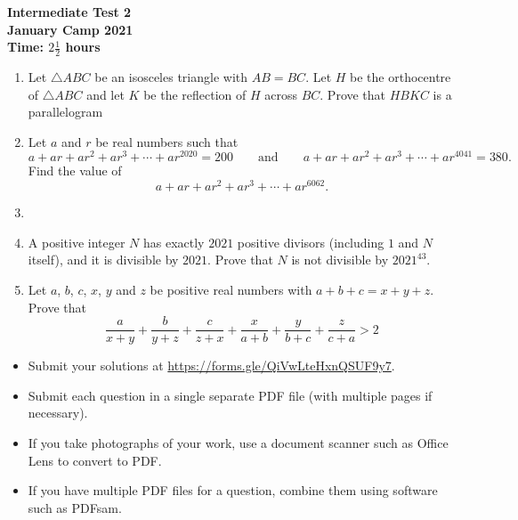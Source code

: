 \documentclass{article}
\begin{document}
\thispagestyle{empty}

\begin{center}
  \textbf{\Large Intermediate Test 2}
  \\ \vspace{1em}
  \textbf{\large January Camp 2021}
  \\ \vspace{1em}
  \textbf{\large Time: $2\frac{1}{2}$ hours}
\end{center}

\vspace{24pt}

\begin{enumerate}[1.]

\item %
Let $\triangle ABC$ be an isosceles triangle with $AB = BC$. Let $H$ be the orthocentre of $\triangle ABC$ and let $K$ be the reflection of $H$ across $BC$. Prove that $HBKC$ is a parallelogram

\item %
Let $a$ and $r$ be real numbers such that
\[ a +ar +ar^2 +ar^3 +\dotsb +ar^{2020} = 200 \qquad\text{and}\qquad a +ar +ar^2 +ar^3 +\dotsb +ar^{4041} = 380. \]
Find the value of
\[ a +ar +ar^2 +ar^3 +\dotsb +ar^{6062}. \]


\item %


\item %
A positive integer $N$ has exactly $2021$ positive divisors (including $1$ and $N$ itself), and it is divisible by $2021$.
Prove that $N$ is not divisible by $2021^{43}$.


\item %
Let $a$, $b$, $c$, $x$, $y$ and $z$ be positive real numbers with $a + b + c = x + y + z$. Prove that 
$$\frac{a}{x + y} + \frac{b}{y + z} + \frac{c}{z + x} + \frac{x}{a + b} + \frac{y}{b + c} + \frac{z}{c + a} > 2 $$


\end{enumerate}


\vfill
\begin{itemize}
	\item Submit your solutions at \url{https://forms.gle/QiVwLteHxnQSUF9y7}.
	\item Submit each question in a single separate PDF file (with multiple pages if necessary).
	\item If you take photographs of your work, use a document scanner such as Office Lens to convert to PDF.
	\item If you have multiple PDF files for a question, combine them using software such as PDFsam.
\end{itemize}

\vfill
\centering
\begin{BVerbatim}
\end{BVerbatim}
\end{document}
